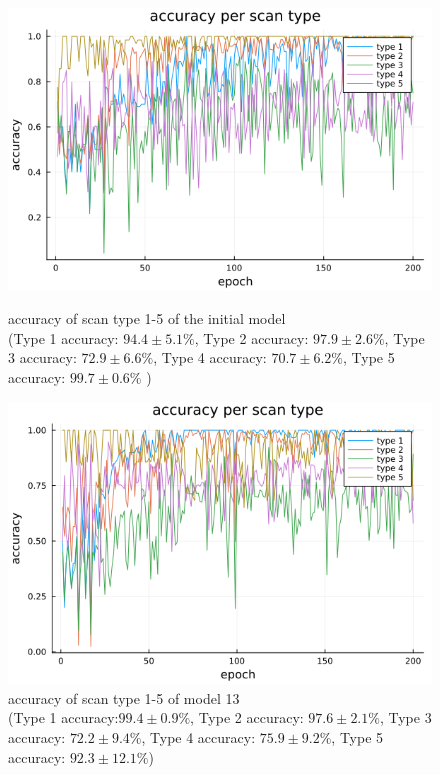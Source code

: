 \documentclass[
a4paper, 
12pt,
grayscalebody, %
abstract=on,
twoside, BCOR10mm, 12pt, DIV13,headinclude, footexclude, final, abstracton, openright
]{ibireprt}
\numberwithin{equation}{chapter}
\numberwithin{table}{chapter}
\numberwithin{figure}{chapter}
\numberwithin{algorithm}{chapter}
\numberwithin{example}{chapter}
\numberwithin{example}{chapter}
\begin{document}
\begin{figure}[h]
	\centering
	\begin{minipage}[t]{.45\linewidth}
		\centering
		\includegraphics[width = \textwidth]{accuracy_per_scan_type_final_run_6_2.png}%
		\captionsetup{width=\textwidth}
		\caption{accuracy of scan type 1-5 of the initial model \\ (Type 1 accuracy: $94.4\pm5.1\%$, Type 2 accuracy: $97.9\pm2.6\%$, Type 3 accuracy: $72.9\pm6.6\%$, Type 4 accuracy: $70.7\pm6.2\%$, Type 5 accuracy: $99.7\pm0.6\%$ )}
		\label{fig:run_6_2_all_accs}
		
	\end{minipage}
	\hfill
	\begin{minipage}[t]{.45\linewidth}
		\centering
		\includegraphics[width = \textwidth]{accuracy_per_scan_type_final_run_6_1.png}%
		\caption{accuracy of scan type 1-5 of model 13 \\(Type 1 accuracy:$99.4\pm0.9\%$, Type 2 accuracy: $97.6\pm2.1\%$, Type 3 accuracy: $72.2\pm9.4\%$, Type 4 accuracy: $75.9\pm9.2\%$, Type 5 accuracy: $92.3\pm12.1\%$) }
		\label{fig:run_6_1_all_accs}
	\end{minipage}
\end{figure}
\end{document}
